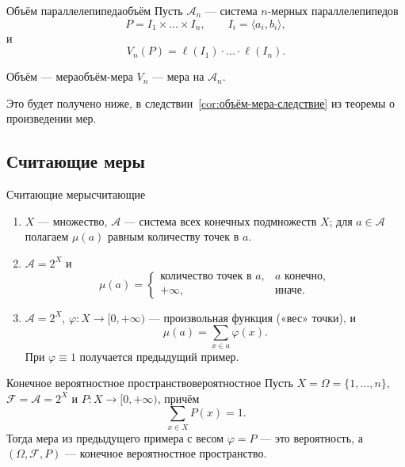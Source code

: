 \begin{Example}{Объём параллелепипеда}{объём}
	Пусть $\mathcal{A}_n$ --- система $n$-мерных параллелепипедов
	\[
	P = I_1 \times \ldots \times I_n, \qquad I_i = \langle a_i, b_i\rangle,
	\]
	и
	\[
	V_n(P) = \ell(I_1) \cdot \ldots \cdot \ell(I_n).
	\]
\end{Example}

\begin{Theorem}{Объём --- мера}{объём-мера}
	$V_n$ --- мера на $\mathcal{A}_n$.
\end{Theorem}

Это будет получено ниже, в следствии~\ref{cor:объём-мера-следствие}
из теоремы о произведении мер.

\subsection{Считающие меры}

\begin{Example}{Считающие меры}{считающие}
	\begin{enumerate}
		\item $X$ --- множество, $\mathcal{A}$ --- система всех конечных
		подмножеств $X$; для $a \in \mathcal{A}$ полагаем $\mu(a)$ равным
		количеству точек в $a$.

		\item $\mathcal{A} = 2^X$ и
		\[
		\mu(a) =
		\begin{cases}
			\text{количество точек в } a, & a \text{ конечно},\\
			+\infty, & \text{иначе}.
		\end{cases}
		\]

		\item $\mathcal{A} = 2^X$, $\varphi : X \to [0,+\infty)$ ---
		произвольная функция («вес» точки), и
		\[
		\mu(a) = \sum_{x \in a} \varphi(x).
		\]
		При $\varphi \equiv 1$ получается предыдущий пример.
	\end{enumerate}
\end{Example}

\begin{Example}{Конечное вероятностное пространство}{вероятностное}
	Пусть $X = \Omega = \{1,\ldots,n\}$, $\mathcal{F} = \mathcal{A} = 2^X$ и
	$P : X \to [0,+\infty)$, причём
	\[
	\sum_{x \in X} P(x) = 1 .
	\]
	Тогда мера из предыдущего примера с весом $\varphi = P$ --- это
	вероятность, а $(\Omega,\mathcal{F},P)$ --- конечное вероятностное
	пространство.
\end{Example}

